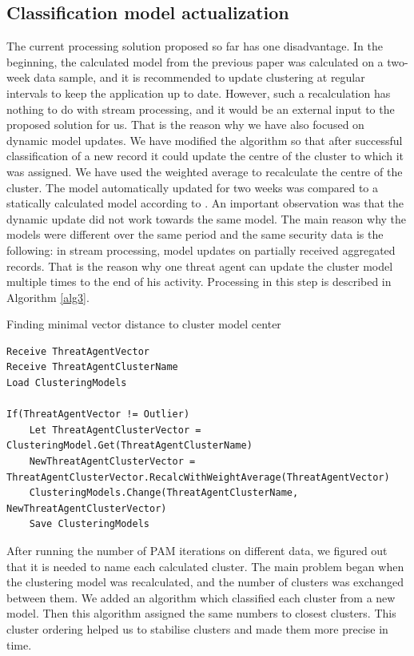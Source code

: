 \documentclass[conference, a4paper]{IEEEtran}
\begin{document}
\subsection{Classification model actualization}
The current processing solution proposed so far has one disadvantage. In the beginning, the calculated model from the previous paper was calculated on a two-week data sample, and it is recommended to update clustering at regular intervals to keep the application up to date. However, such a recalculation has nothing to do with stream processing, and it would be an external input to the proposed solution for us. That is the reason why we have also focused on dynamic model updates. We have modified the algorithm so that after successful classification of a new record it could update the centre of the cluster to which it was assigned. We have used the weighted average to recalculate the centre of the cluster. The model automatically updated for two weeks was compared to a statically calculated model according to \cite{bajtovs2018network}. An important observation was that the dynamic update did not work towards the same model. The main reason why the models were different over the same period and the same security data is the following: in stream processing, model updates on partially received aggregated records. That is the reason why one threat agent can update the cluster model multiple times to the end of his activity. Processing in this step is described in Algorithm \ref{alg3}.

\begin{algorithm}
\caption{Finding minimal vector distance to cluster model center}
\label{alg3}
\begin{lstlisting}
Receive ThreatAgentVector 
Receive ThreatAgentClusterName 
Load ClusteringModels 

If(ThreatAgentVector != Outlier)  
    Let ThreatAgentClusterVector = ClusteringModel.Get(ThreatAgentClusterName) 
    NewThreatAgentClusterVector = ThreatAgentClusterVector.RecalcWithWeightAverage(ThreatAgentVector) 
    ClusteringModels.Change(ThreatAgentClusterName, NewThreatAgentClusterVector)
    Save ClusteringModels 
\end{lstlisting}
\end{algorithm}

After running the number of PAM iterations on different data, we figured out that it is needed to name each calculated cluster. The main problem began when the clustering model was recalculated, and the number of clusters was exchanged between them. We added an algorithm which classified each cluster from a new model. Then this algorithm assigned the same numbers to closest clusters. This cluster ordering helped us to stabilise clusters and made them more precise in time.
\end{document}
